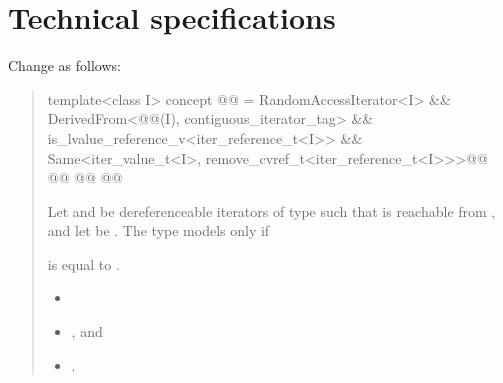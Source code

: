 \chapter{Technical specifications}
Change  as follows:
\begin{quote}
\begin{codeblock}
template<class I>
  concept @@ =
    RandomAccessIterator<I> &&
    DerivedFrom<@@(I), contiguous_iterator_tag> &&
    is_lvalue_reference_v<iter_reference_t<I>> &&
    Same<iter_value_t<I>, remove_cvref_t<iter_reference_t<I>>>@\changed{;}{ \&\&}@
    @@
      @@
    @\added{\};}@
\end{codeblock}

\setcounter{Paras}{1}
\pnum
Let  and  be dereferenceable iterators  of type 
such that  is reachable from  ,
and let  be .
The type  models  only if
\begin{removedblock}
is equal to
.
\end{removedblock}
\begin{addedblock}
\begin{itemize}
\item {}
\item {}, and
\item {}.
\end{itemize}
\end{addedblock}
\end{quote}


